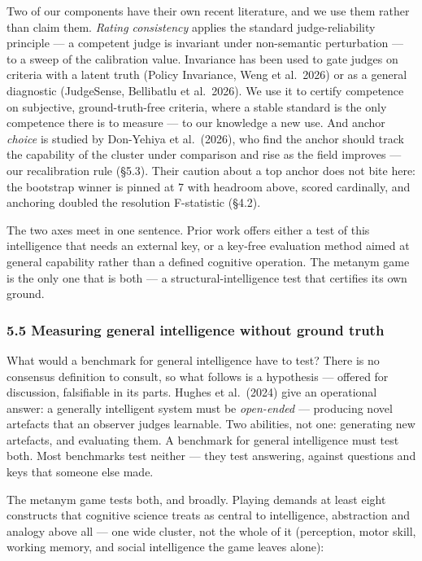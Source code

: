 Two of our components have their own recent literature, and we use them rather than claim them. \emph{Rating consistency} applies the standard judge-reliability principle --- a competent judge is invariant under non-semantic perturbation --- to a sweep of the calibration value. Invariance has been used to gate judges on criteria with a latent truth (Policy Invariance, Weng et al.~2026) or as a general diagnostic (JudgeSense, Bellibatlu et al.~2026). We use it to certify competence on subjective, ground-truth-free criteria, where a stable standard is the only competence there is to measure --- to our knowledge a new use. And anchor \emph{choice} is studied by Don-Yehiya et al.~(2026), who find the anchor should track the capability of the cluster under comparison and rise as the field improves --- our recalibration rule (§5.3). Their caution about a top anchor does not bite here: the bootstrap winner is pinned at 7 with headroom above, scored cardinally, and anchoring doubled the resolution F-statistic (§4.2).

The two axes meet in one sentence. Prior work offers either a test of this intelligence that needs an external key, or a key-free evaluation method aimed at general capability rather than a defined cognitive operation. The metanym game is the only one that is both --- a structural-intelligence test that certifies its own ground.

\subsubsection{5.5 Measuring general intelligence without ground truth}\label{measuring-general-intelligence-without-ground-truth}

What would a benchmark for general intelligence have to test? There is no consensus definition to consult, so what follows is a hypothesis --- offered for discussion, falsifiable in its parts. Hughes et al.~(2024) give an operational answer: a generally intelligent system must be \emph{open-ended} --- producing novel artefacts that an observer judges learnable. Two abilities, not one: generating new artefacts, and evaluating them. A benchmark for general intelligence must test both. Most benchmarks test neither --- they test answering, against questions and keys that someone else made.

The metanym game tests both, and broadly. Playing demands at least eight constructs that cognitive science treats as central to intelligence, abstraction and analogy above all --- one wide cluster, not the whole of it (perception, motor skill, working memory, and social intelligence the game leaves alone):

